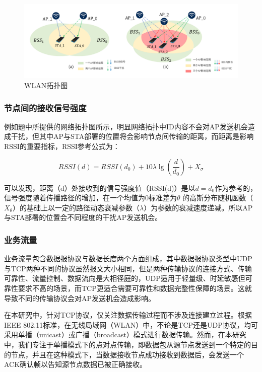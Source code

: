 \begin{figure}[H]
	\centering
	\includegraphics[width=1\linewidth]{figures/阔谱图}
	\caption{WLAN拓扑图}
	\label{fig:}
\end{figure}




\subsubsection{节点间的接收信号强度}

例如题中所提供的网络拓扑图所示，明显网络拓扑中ID内容不会对AP发送机会造成干扰，但其中AP与STA部署的位置将会影响节点间传输的距离，而距离是影响RSSI的重要指标，RSSI参考公式为：

\begin{equation}
	RSSI\left( d \right) =RSSI\left( d_0 \right) +10\lambda \lg \left( \frac{d}{d_0} \right) +X_{\sigma}
\end{equation}

可以发现，距离（d）处接收到的信号强度值（RSSI(d)）是以$d=d_0$作为参考的，信号强度随着传播路径的增加，在一个均值为0标准差为$ \theta $ 的高斯分布随机函数（$X_{ \theta }$）的基础上以一定的路径动态衰减参数（$ \lambda $）为参数的衰减速度递减。所以AP与STA部署的位置会不同程度的干扰AP发送机会。

\subsubsection{业务流量}

业务流量包含数据报协议与数据长度两个方面组成，其中数据报协议类型中UDP与TCP两种不同的协议虽然报文大小相同，但是两种传输协议的连接方式、传输可靠性、流量控制、数据流向是大相径庭的，UDP适用于轻量级、时延敏感但可靠性要求不高的场景，而TCP更适合需要可靠性和数据完整性保障的场景。这就导致不同的传输协议会对AP发送机会造成影响。

在本研究中，针对TCP协议，仅关注数据传输过程而不涉及连接建立过程。根据IEEE 802.11标准，在无线局域网（WLAN）中，不论是TCP还是UDP协议，均可采用单播（unicast）或广播（broadcast）模式进行数据传输。然而，在本研究中，我们专注于单播模式下的点对点传输，即数据包从源节点发送到一个特定的目的节点，并且在这种模式下，当数据接收节点成功接收到数据后，会发送一个ACK确认帧以告知源节点数据已被正确接收。

